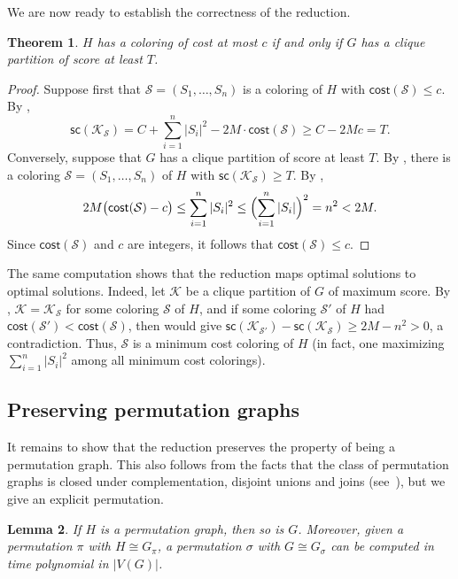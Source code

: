 \documentclass[a4paper,fleqn]{cas-sc}
\newtheorem{thm}{Theorem}[section]
\newtheorem{lem}[thm]{Lemma}
\theoremstyle{remark}
\theoremstyle{plain}
\newcommand{\cost}{{\mathsf{cost}}}
\newcommand{\score}{{\mathsf{sc}}}
\begin{document}
We are now ready to establish the correctness of the reduction.

\begin{thm} \label{thm:reduction}
    $H$ has a coloring of cost at most $c$ if and only if $G$ has a clique partition of score at least $T$.
\end{thm}

\begin{proof}
    Suppose first that $\mathcal{S}=(S_1, \dots, S_n)$ is a coloring of $H$ with $\cost(\mathcal{S}) \leq c$.  By ,
    \[
        \score(\mathcal{K}_{\mathcal{S}}) = C + \sum_{i=1}^n |S_i|^2 - 2M\cdot \cost(\mathcal{S}) \geq C - 2Mc = T.
    \]
    Conversely, suppose that $G$ has a clique partition of score at least $T$.  By , there is a coloring $\mathcal{S}=(S_1, \dots, S_n)$ of $H$ with $\score(\mathcal{K}_{\mathcal{S}}) \geq T$.  By ,
    \[
        2M\bigl(\cost(\mathcal{S}) - c\bigr) \leq \sum_{i=1}^n |S_i|^2 \leq \Bigl(\sum_{i=1}^n |S_i|\Bigr)^2 = n^2 < 2M.
    \]
    Since $\cost(\mathcal{S})$ and $c$ are integers, it follows that $\cost(\mathcal{S}) \leq c$.
\end{proof}

The same computation shows that the reduction maps optimal solutions to optimal solutions. Indeed, let $\mathcal{K}$ be a clique partition of $G$ of maximum score. By , $\mathcal{K}=\mathcal{K}_{\mathcal{S}}$ for some coloring $\mathcal{S}$ of $H$, and if some coloring $\mathcal{S}'$ of $H$ had $\cost(\mathcal{S}') < \cost(\mathcal{S})$, then  would give $\score(\mathcal{K}_{\mathcal{S}'}) - \score(\mathcal{K}_{\mathcal{S}}) \geq 2M - n^2 > 0$, a contradiction.  Thus, $\mathcal{S}$ is a minimum cost coloring of $H$ (in fact, one maximizing $\sum_{i=1}^n |S_i|^2$ among all minimum cost colorings).

\subsection{Preserving permutation graphs}

It remains to show that the reduction preserves the property of being a permutation graph.  This also follows from the facts that the class of permutation graphs is closed under complementation, disjoint unions and joins (see~\cite{golumbic2004}), but we give an explicit permutation.

\begin{lem} \label{lem:G-permutation}
    If $H$ is a permutation graph, then so is $G$.  Moreover, given a permutation $\pi$ with $H \cong G_\pi$, a permutation $\sigma$ with $G \cong G_\sigma$ can be computed in time polynomial in $|V(G)|$.
\end{lem}
\end{document}
